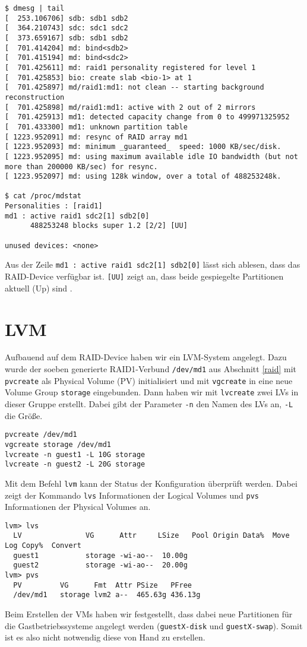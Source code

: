 \setupVerbatimOut
\begin{verbatim}
$ dmesg | tail
[  253.106706] sdb: sdb1 sdb2
[  364.210743] sdc: sdc1 sdc2
[  373.659167] sdb: sdb1 sdb2
[  701.414204] md: bind<sdb2>
[  701.415194] md: bind<sdc2>
[  701.425611] md: raid1 personality registered for level 1
[  701.425853] bio: create slab <bio-1> at 1
[  701.425897] md/raid1:md1: not clean -- starting background reconstruction
[  701.425898] md/raid1:md1: active with 2 out of 2 mirrors
[  701.425913] md1: detected capacity change from 0 to 499971325952
[  701.433300] md1: unknown partition table
[ 1223.952091] md: resync of RAID array md1
[ 1223.952093] md: minimum _guaranteed_  speed: 1000 KB/sec/disk.
[ 1223.952095] md: using maximum available idle IO bandwidth (but not more than 200000 KB/sec) for resync.
[ 1223.952097] md: using 128k window, over a total of 488253248k.

$ cat /proc/mdstat
Personalities : [raid1] 
md1 : active raid1 sdc2[1] sdb2[0]
      488253248 blocks super 1.2 [2/2] [UU]
      
unused devices: <none>
\end{verbatim}

Aus der Zeile \verb#md1 : active raid1 sdc2[1] sdb2[0]# lässt sich ablesen, dass das RAID-Device verfügbar ist. \verb#[UU]# zeigt an, dass beide gespiegelte Partitionen aktuell (Up) sind \cite{wiki_mdstat}.

\section{LVM}
\label{lvm}
Aufbauend auf dem RAID-Device haben wir ein LVM-System angelegt. Dazu wurde der soeben generierte RAID1-Verbund \verb#/dev/md1# aus Abschnitt \ref{raid} mit \verb#pvcreate# als Physical Volume (PV) initialisiert und mit \verb#vgcreate# in eine neue Volume Group \verb#storage# eingebunden. 
Dann haben wir mit \verb#lvcreate# zwei LVs in dieser Gruppe erstellt. Dabei gibt der Parameter \verb#-n# den Namen des LVs an, \verb#-L# die Größe. 
\begin{verbatim}
pvcreate /dev/md1 
vgcreate storage /dev/md1
lvcreate -n guest1 -L 10G storage
lvcreate -n guest2 -L 20G storage
\end{verbatim} 
Mit dem Befehl \verb#lvm# kann der Status der Konfiguration überprüft werden. Dabei zeigt der Kommando \verb#lvs# Informationen der Logical Volumes und \verb#pvs# Informationen der Physical Volumes an. 
\setupVerbatimOut
{}
\begin{verbatim}
lvm> lvs
  LV               VG      Attr     LSize   Pool Origin Data%  Move Log Copy%  Convert                                        
  guest1           storage -wi-ao--  10.00g                                           
  guest2           storage -wi-ao--  20.00g                                           
lvm> pvs
  PV         VG      Fmt  Attr PSize   PFree  
  /dev/md1   storage lvm2 a--  465.63g 436.13g
\end{verbatim} 
Beim Erstellen der VMs haben wir festgestellt, dass dabei neue Partitionen für die Gastbetriebssysteme angelegt werden (\verb#guestX-disk# und \verb#guestX-swap#). Somit ist es also nicht notwendig diese von Hand zu erstellen. 

